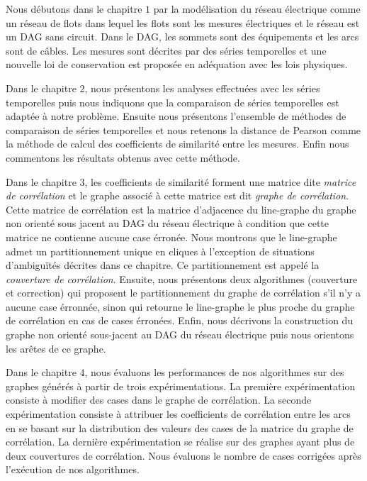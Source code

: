 Nous d\'ebutons dans le chapitre $1$ par la mod\'elisation du r\'eseau \'electrique comme un r\'eseau de flots dans lequel les flots sont les mesures \'electriques et le r\'eseau est un DAG sans circuit. Dans le DAG, les sommets sont des \'equipements et les arcs sont de c\^ables. Les mesures sont d\'ecrites par des s\'eries temporelles et une nouvelle loi de conservation \cite{loiDeConservation} est propos\'ee en ad\'equation avec les lois physiques.
 \newline
 
 Dans le chapitre $2$, nous pr\'esentons les analyses effectu\'ees avec les s\'eries temporelles puis  nous indiquons que la comparaison de s\'eries temporelles est adapt\'ee \`a notre probl\`eme. Ensuite nous pr\'esentons l'ensemble de m\'ethodes de comparaison de s\'eries temporelles et nous retenons la distance de Pearson comme la m\'ethode de calcul des coefficients de similarit\'e  entre les mesures. Enfin nous commentons les r\'esultats obtenus avec cette m\'ethode.
 \newline
 
 Dans le chapitre $3$, les coefficients de similarit\'e forment une matrice dite {\em matrice de corr\'elation} et le graphe associ\'e \`a cette matrice est dit {\em graphe de corr\'elation}. Cette matrice de corr\'elation est la matrice d'adjacence du line-graphe du graphe non orient\'e sous jacent au DAG du r\'eseau \'electrique \`a condition que cette matrice ne contienne aucune case \'erron\'ee. Nous montrons que le line-graphe admet un partitionnement unique en cliques \`a l'exception de situations d'ambigu\"{i}t\'es d\'ecrites dans ce chapitre. Ce partitionnement est appel\'e la {\em couverture de corr\'elation}.  
 Ensuite, nous pr\'esentons deux algorithmes (couverture et correction) qui proposent le partitionnement du graphe de corr\'elation s'il n'y a aucune case \'erronn\'ee, sinon qui retourne le line-graphe le plus proche du graphe de corr\'elation en cas de cases \'erron\'ees.
 Enfin, nous d\'ecrivons la construction du graphe non orient\'e sous-jacent au DAG du r\'eseau \'electrique puis nous orientons les ar\^etes de ce graphe.
 \newline
 
 Dans le chapitre $4$, nous \'evaluons les performances de nos algorithmes sur des graphes g\'en\'er\'es  \`a partir de trois exp\'erimentations. La premi\`ere exp\'erimentation consiste \`a modifier des cases dans le graphe de corr\'elation. La seconde exp\'erimentation consiste \`a attribuer les coefficients de corr\'elation entre les arcs en se basant sur la distribution des valeurs des cases de la matrice du graphe de corr\'elation. La derni\`ere  exp\'erimentation se r\'ealise sur des graphes ayant plus de deux couvertures de corr\'elation. 
Nous \'evaluons le nombre de cases corrig\'ees apr\`es l'ex\'ecution de nos algorithmes.
 
